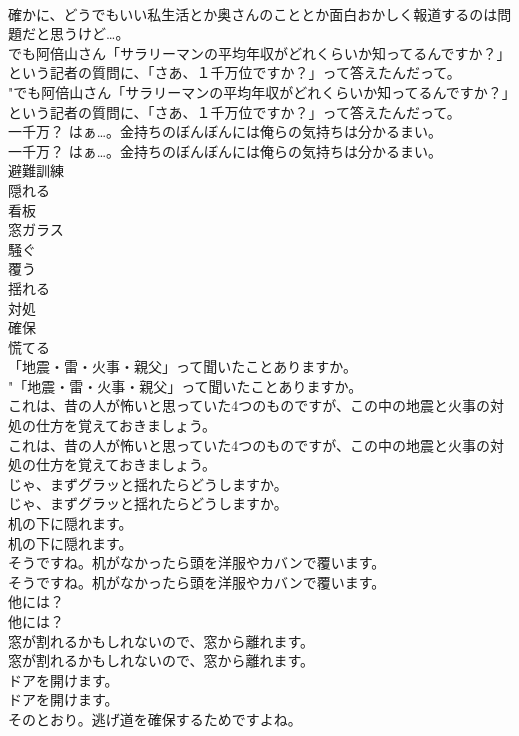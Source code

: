 \documentclass[8pt]{extreport}
\begin{document}
\begin{CJK}{UTF8}{min}
\\	確かに、どうでもいい私生活とか奥さんのこととか面白おかしく報道するのは問題だと思うけど…。 
\\	でも阿倍山さん「サラリーマンの平均年収がどれくらいか知ってるんですか？」という記者の質問に、「さあ、１千万位ですか？」って答えたんだって。	
\\	"でも阿倍山さん「サラリーマンの平均年収がどれくらいか知ってるんですか？」という記者の質問に、「さあ、１千万位ですか？」って答えたんだって。 
\\	一千万？ はぁ…。金持ちのぼんぼんには俺らの気持ちは分かるまい。	
\\	一千万？ はぁ…。金持ちのぼんぼんには俺らの気持ちは分かるまい。 
\\	避難訓練
\\	隠れる
\\	看板
\\	窓ガラス
\\	騒ぐ
\\	覆う
\\	揺れる
\\	対処
\\	確保
\\	慌てる
\\	「地震・雷・火事・親父」って聞いたことありますか。	
\\	"「地震・雷・火事・親父」って聞いたことありますか。 
\\	これは、昔の人が怖いと思っていた4つのものですが、この中の地震と火事の対処の仕方を覚えておきましょう。	
\\	これは、昔の人が怖いと思っていた4つのものですが、この中の地震と火事の対処の仕方を覚えておきましょう。 
\\	じゃ、まずグラッと揺れたらどうしますか。	
\\	じゃ、まずグラッと揺れたらどうしますか。 
\\	机の下に隠れます。	
\\	机の下に隠れます。 
\\	そうですね。机がなかったら頭を洋服やカバンで覆います。	
\\	そうですね。机がなかったら頭を洋服やカバンで覆います。 
\\	他には？	
\\	他には？ 
\\	窓が割れるかもしれないので、窓から離れます。	
\\	窓が割れるかもしれないので、窓から離れます。 
\\	ドアを開けます。	
\\	ドアを開けます。 
\\	そのとおり。逃げ道を確保するためですよね。	

\end{CJK}
\end{document}
